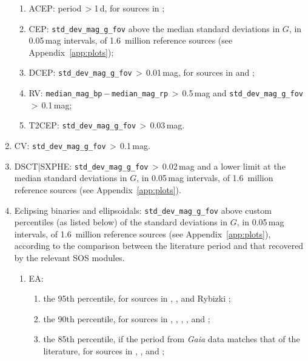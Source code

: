 \documentclass[longauth]{aa}
\def\gaia{\textit{Gaia}\xspace}
\def\g{$G$\xspace}
\begin{document}
\begin{appendix}
\begin{enumerate}
    \begin{enumerate}
        \item ACEP: period\,$>$1\,d, for sources in \citet{2014ApJS..213....9D};
        \item CEP: \texttt{std\_dev\_mag\_g\_fov} above the median standard deviations in \g, in 0.05\,mag intervals, of 1.6~million reference sources (see Appendix~\ref{app:plots});
        \item DCEP: \texttt{std\_dev\_mag\_g\_fov}\,$>$\,0.01\,mag, for sources in \citet{2012AcA....62..219S,2015AcA....65..297S,2017AcA....67..297S,2020AcA....70..101S} and \citet{2018AcA....68..315U};
        \item RV: \texttt{median\_mag\_bp}\,$-$\,\texttt{median\_mag\_rp}\,$>$\,0.5\,mag and \texttt{std\_dev\_mag\_g\_fov}\,$>$\,0.1\,mag;
        \item T2CEP:  \texttt{std\_dev\_mag\_g\_fov}\,$>$\,0.03\,mag.
    \end{enumerate}
    \item CV: \texttt{std\_dev\_mag\_g\_fov}\,$>$\,0.1\,mag.
    \item DSCT|SXPHE: \texttt{std\_dev\_mag\_g\_fov}\,$>$\,0.02\,mag and a lower limit at the median standard deviations in \g, in 0.05\,mag intervals, of 1.6~million reference sources (see Appendix~\ref{app:plots}).
    \item Eclipsing binaries and ellipsoidals: \texttt{std\_dev\_mag\_g\_fov} above custom percentiles (as listed below) of the  standard deviations in \g, in 0.05\,mag intervals, of 1.6~million reference sources (see Appendix~\ref{app:plots}), according to the comparison between the literature period and that recovered by the relevant SOS modules.
    \begin{enumerate}
    \item EA: 
     \begin{enumerate}
 \item the 95th percentile, for sources in \citet{2014ApJS..213....9D,2017MNRAS.469.3688D}, \citet{2013AJ....146..101P}, and Rybizki \citep[catalogue GAIA\_ECL\_RYBIZKI\_2018 in][]{DR3-DPACP-177};
 \item the 90th percentile, for sources in \citet{2020ApJS..249...18C}, \citet{1997ESASP1200.....E}, \citet{2013AcA....63..323P,2016AcA....66..421P}, \citet{2009AcA....59...33P}, and \citet{2016AcA....66..405S};
 \item the 85th percentile, if the period from \gaia data matches that of the literature, for sources in \citet{2016AJ....151...68K}, \citet{2016AcA....66..421P}, and \citet{2016AcA....66..405S};

\end{enumerate}
\end{enumerate}
\end{enumerate}
\end{appendix}
\end{document}
